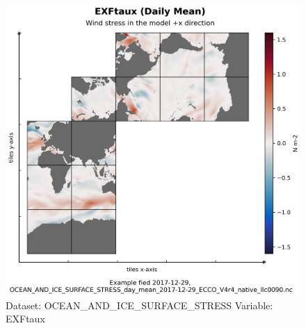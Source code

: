 \begin{figure}[H]
\centering
\includegraphics[width=\textwidth]{../images/plots/native_plots/Ocean_and_Sea-Ice_Surface_Stress/EXFtaux.png}
\caption{Dataset: OCEAN\_AND\_ICE\_SURFACE\_STRESS Variable: EXFtaux}
\label{tab:table-OCEAN_AND_ICE_SURFACE_STRESS_EXFtaux-Plot}
\end{figure}
\pagebreak
